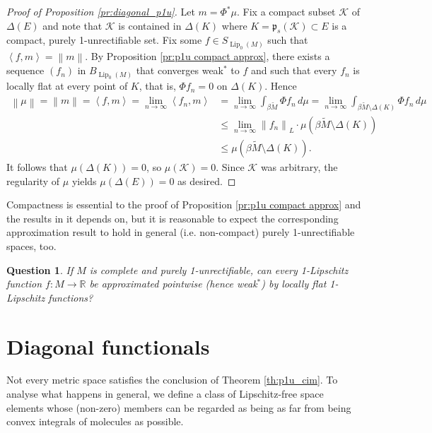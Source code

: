 \documentclass[a4paper,10pt]{amsart}
\DeclareMathOperator{\Lip}{Lip}                             %
\newcommand{\RR}{\mathbb{R}}                                %
\newcommand{\norm}[1]{\left\|{#1}\right\|}                  %
\newcommand{\duality}[1]{\left<{#1}\right>}                 %
\newcommand{\lipnorm}[1]{\norm{#1}_L}                       %
\newcommand{\wt}[1]{\widetilde{#1}}                         %
\newcommand{\bwt}[1]{\beta\wt{#1}}                          %
\newcommand{\pp}{\mathfrak{p}}                              %
\renewcommand{\leq}{\leqslant}
\theoremstyle{plain}
\newtheorem{question}{Question}
\theoremstyle{definition}
\theoremstyle{remark}
\begin{document}
\begin{proof}[Proof of Proposition \ref{pr:diagonal_p1u}]
Let $m=\Phi^*\mu$. Fix a compact subset $\mathcal{K}$ of $\Delta(E)$ and note that $\mathcal{K}$ is contained in $\Delta(K)$ where $K=\pp_s(\mathcal{K})\subset E$ is a compact, purely 1-unrectifiable set. Fix some $f\in S_{\Lip_0(M)}$ such that $\duality{f,m}=\norm{m}$. By Proposition \ref{pr:p1u compact approx}, there exists a sequence $(f_n)$ in $B_{\Lip_0(M)}$ that converges weak$^*$ to $f$ and such that every $f_n$ is locally flat at every point of $K$, that is, $\Phi f_n=0$ on $\Delta(K)$. Hence
\begin{align*}
\norm{\mu} = \norm{m} = \duality{f,m} = \lim_{n\to\infty} \duality{f_n,m} &= \lim_{n\to\infty}\int_{\bwt{M}} \Phi f_n \,d\mu = \lim_{n\to\infty}\int_{\bwt{M}\setminus \Delta(K)} \Phi f_n \,d\mu \\
&\leq \lim_{n\to\infty}\lipnorm{f_n}\cdot\mu(\bwt{M}\setminus \Delta(K)) \\
&\leq \mu(\bwt{M}\setminus \Delta(K)) .
\end{align*}
It follows that $\mu(\Delta(K))=0$, so $\mu(\mathcal{K})=0$. Since $\mathcal{K}$ was arbitrary, the regularity of $\mu$ yields $\mu(\Delta(E))=0$ as desired.
\end{proof}

Compactness is essential to the proof of 
Proposition \ref{pr:p1u compact approx} and the results in \cite[Section 2]{AGPP} it depends on, but it is reasonable to expect the corresponding approximation result to hold in general (i.e. non-compact) purely 1-unrectifiable spaces, too.

\begin{question}
If $M$ is complete and purely 1-unrectifiable, can every 1-Lipschitz function $f:M\to\RR$ be approximated pointwise (hence weak$^*$) by locally flat 1-Lipschitz functions?
\end{question}



\section{Diagonal functionals}
\label{sec:diagonal}

Not every metric space satisfies the conclusion of Theorem \ref{th:p1u_cim}. To analyse what happens in general, we define a class of Lipschitz-free space elements whose (non-zero) members can be regarded as being as far from being convex integrals of molecules as possible.
\end{document}
